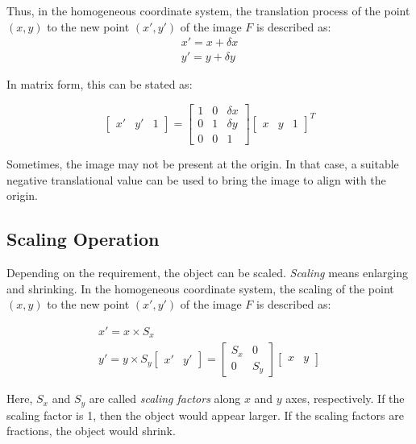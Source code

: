 Thus, in the homogeneous coordinate system, the translation process of the point $(x,y)$ to the new point $(x',y')$ of the image \textbf{$F$} is described as:
\begin{gather*}
    x' = x + \delta x\\
    y' = y + \delta y
\end{gather*}

In matrix form, this can be stated as:

\begin{equation*}
    \begin{bmatrix}
    x' & y' & 1
    \end{bmatrix}  = \begin{bmatrix}
    1 & 0 & \delta x\\
    0 & 1 & \delta y\\
    0 & 0 & 1
    \end{bmatrix}\begin{bmatrix}
    x & y & 1
    \end{bmatrix}^{T}
\end{equation*}

Sometimes, the image may not be present at the origin.
In that case, a suitable negative translational value can be used to bring the image to align with the origin.

\subsection{Scaling Operation}
Depending on the requirement, the object can be scaled.
\textit{Scaling} means enlarging and shrinking.
In the homogeneous coordinate system, the scaling of the point $(x,y)$ to the new point $(x',y')$ of the image \textbf{$F$} is described as:

\begin{gather*}
    x' = x \times S_x\\
    y' = y \times S_y
    \begin{bmatrix}
        x' & y'
    \end{bmatrix} = \begin{bmatrix}
        S_x & 0\\
        0 & S_y
    \end{bmatrix}\begin{bmatrix}
        x & y
    \end{bmatrix}
\end{gather*}

Here, $S_x$ and $S_y$ are called \textit{scaling factors} along $x$ and $y$ axes, respectively.
If the scaling factor is 1, then the object would appear larger.
If the scaling factors are fractions, the object would shrink.

